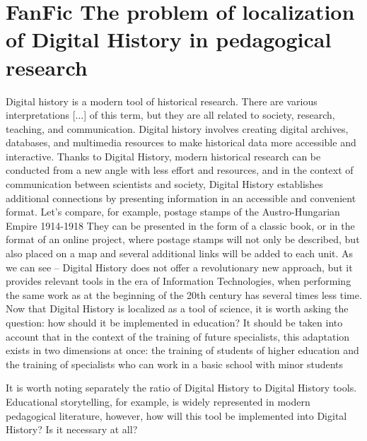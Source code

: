 
\section{FanFic The problem of localization of Digital History in pedagogical research}


Digital history is a modern tool of historical research. There are various interpretations [...] of this term, but they are all related to society, research, teaching, and communication.
Digital history involves creating digital archives, databases, and multimedia resources to make historical data more accessible and interactive. Thanks to Digital History, modern historical research can be conducted from a new angle with less effort and resources, and in the context of communication between scientists and society, Digital History establishes additional connections by presenting information in an accessible and convenient format. Let's compare, for example, postage stamps of the Austro-Hungarian Empire 1914-1918 %
They can be presented in the form of a classic book, or in the format of an online project, where postage stamps will not only be described, but also placed on a map and several additional links will be added to each unit. As we can see -- Digital History does not offer a revolutionary new approach, but it provides relevant tools in the era of Information Technologies, when performing the same work as at the beginning of the 20th century has several times less time.
Now that Digital History is localized as a tool of science, it is worth asking the question: how should it be implemented in education? It should be taken into account that in the context of the training of future specialists, this adaptation exists in two dimensions at once: the training of students of higher education and the training of specialists who can work in a basic school with minor students

It is worth noting separately the ratio of Digital History to Digital History tools. Educational storytelling, for example, is widely represented in modern pedagogical literature, however, how will this tool be implemented into Digital History? Is it necessary at all?

